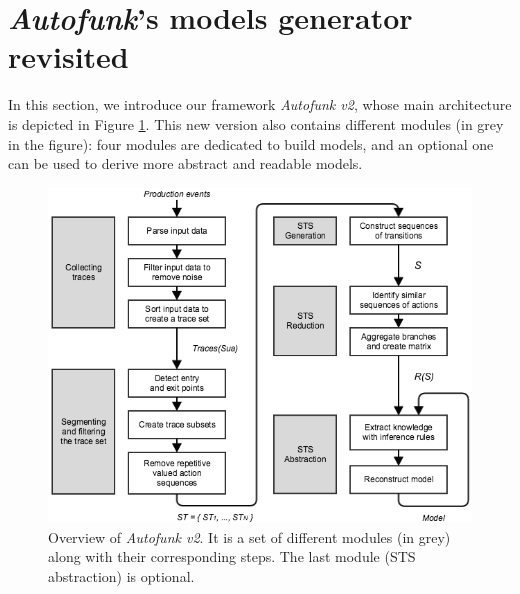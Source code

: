 
\section{\textit{Autofunk}'s models generator revisited}
\label{sec:modelinf:prodsystems:autofunk}

In this section, we introduce our framework \textit{Autofunk v2},
whose main architecture is depicted in Figure
\ref{fig:prodsystems:autofunk-overview}. This new version also
contains different modules (in grey in the figure): four modules
are dedicated to build models, and an optional one can be used to
derive more abstract and readable models.

\begin{figure}[ht]
    \begin{center}
        \includegraphics[width=1.0\linewidth]{figures/autofunk.png}
    \end{center}

    \caption{Overview of \textit{Autofunk v2}. It is a set of
    different modules (in grey) along with their corresponding
    steps. The last module (STS abstraction) is optional.}
    \label{fig:prodsystems:autofunk-overview}
\end{figure}

